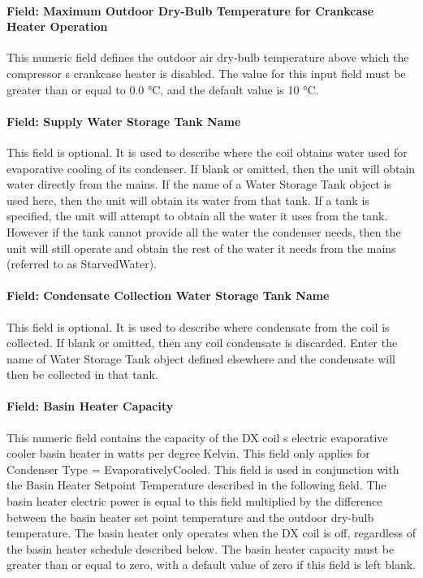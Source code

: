 \paragraph{Field: Maximum Outdoor Dry-Bulb Temperature for Crankcase Heater Operation}\label{field-maximum-outdoor-dry-bulb-temperature-for-crankcase-heater-operation}

This numeric field defines the outdoor air dry-bulb temperature above which the compressor s crankcase heater is disabled. The value for this input field must be greater than or equal to 0.0 °C, and the default value is 10 °C.

\paragraph{Field: Supply Water Storage Tank Name}\label{field-supply-water-storage-tank-name-000}

This field is optional. It is used to describe where the coil obtains water used for evaporative cooling of its condenser. If blank or omitted, then the unit will obtain water directly from the mains. If the name of a Water Storage Tank object is used here, then the unit will obtain its water from that tank. If a tank is specified, the unit will attempt to obtain all the water it uses from the tank. However if the tank cannot provide all the water the condenser needs, then the unit will still operate and obtain the rest of the water it needs from the mains (referred to as StarvedWater).

\paragraph{Field: Condensate Collection Water Storage Tank Name}\label{field-condensate-collection-water-storage-tank-name-2}

This field is optional. It is used to describe where condensate from the coil is collected. If blank or omitted, then any coil condensate is discarded. Enter the name of Water Storage Tank object defined elsewhere and the condensate will then be collected in that tank.

\paragraph{Field: Basin Heater Capacity}\label{field-basin-heater-capacity-000}

This numeric field contains the capacity of the DX coil s electric evaporative cooler basin heater in watts per degree Kelvin. This field only applies for Condenser Type = EvaporativelyCooled. This field is used in conjunction with the Basin Heater Setpoint Temperature described in the following field. The basin heater electric power is equal to this field multiplied by the difference between the basin heater set point temperature and the outdoor dry-bulb temperature. The basin heater only operates when the DX coil is off, regardless of the basin heater schedule described below. The basin heater capacity must be greater than or equal to zero, with a default value of zero if this field is left blank.


